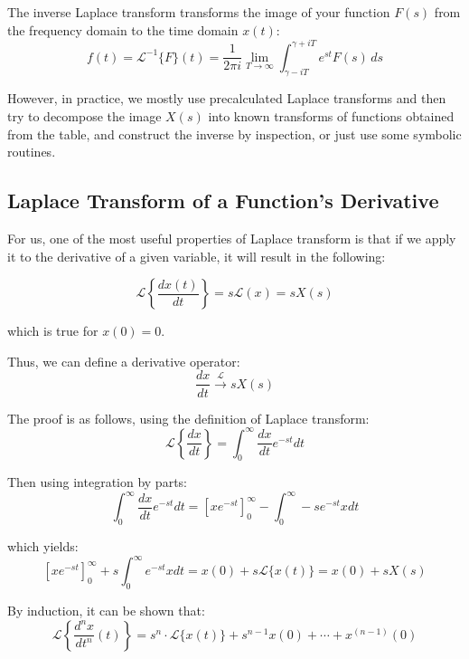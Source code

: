 The inverse Laplace transform transforms the image of your function \(F(s)\) from the frequency domain to the time domain \(x(t)\):
\begin{equation}
    f(t) = {\mathcal {L}}^{-1}\{F\}(t) = {\frac {1}{2\pi i}}\lim _{T\to \infty }\int _{\gamma -iT}^{\gamma +iT}e^{st}F(s)\,ds
\end{equation}

However, in practice, we mostly use precalculated Laplace transforms and then try to decompose the image \(X(s)\) into known transforms of functions obtained from the table, and construct the inverse by inspection, or just use some symbolic routines.

\subsection{Laplace Transform of a Function's Derivative}

For us, one of the most useful properties of Laplace transform is that if we apply it to the derivative of a given variable, it will result in the following:

\begin{equation}
    \mathcal{L}\left\{\frac{dx(t)}{dt}\right\} = s \mathcal{L}\left(x\right) = s X(s)
\end{equation}

which is true for \(x(0) = 0\).

Thus, we can define a derivative operator:
\begin{equation}
    \frac{dx}{dt} \xrightarrow{\mathcal{L}} s X(s)
\end{equation}

The proof is as follows, using the definition of Laplace transform:
\begin{equation}
    \mathcal{L}\left\{\frac{dx}{dt}\right\} = \int_0^\infty \frac{dx}{dt} e^{-st}dt
\end{equation}

Then using integration by parts:
\begin{equation}
    \int_0^\infty \frac{dx}{dt} e^{-st}dt =  \left[x e^{-st} \right]_0^\infty - \int_0^\infty -se^{-st} x dt
\end{equation}

which yields:
\begin{equation}
    \left[x e^{-st} \right]_0^\infty + s\int_0^\infty e^{-st} x dt = x(0) + s\mathcal{L}\{x(t)\} = x(0) + sX(s)
\end{equation}

By induction, it can be shown that:
\begin{equation}
    {\mathcal {L}}\left\{\frac{d^{n}x}{dt^{n}}(t)\right\}=s^{n}\cdot {\mathcal {L}}\{x(t)\}+s^{n-1}x(0)+\cdots +x^{(n-1)}(0)
\end{equation}

